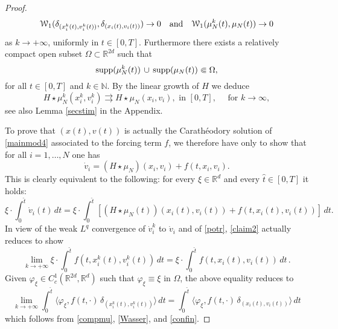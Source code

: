 \documentclass[11pt]{article}
\theoremstyle{plain}
\theoremstyle{definition}
\theoremstyle{remark}
\numberwithin{equation}{section}
\newcommand{\supp}{{\rm supp}}
\newcommand{\R}{{\mathbb R}}
\newcommand{\Om}{\Omega}
\newcommand{\N}{\mathbb N}
\begin{document}
\begin{proof}
\begin{equation}\label{Wasser}
\mathcal W_1 (\delta_{(x_i^k(t),v_i^k(t))}, \delta_{(x_i(t),v_i(t))})\to 0\quad\hbox{and}\quad \mathcal W_1 (\mu_N^k(t), \mu_N(t))\to 0
\end{equation}
as $k\to +\infty$, uniformly in $t\in [0,T]$. Furthermore there exists a relatively compact open subset $\Om \subset \R^{2d}$ such that
\begin{equation}\label{confin}
\supp (\mu_N^k(t))\, \cup \,\supp (\mu_N(t)) \Subset  \Omega,
\end{equation}
for all $t \in [0,T]$ and $k\in \N$. By the linear growth of $H$ we deduce
\begin{equation}\label{potr}
H \star \mu_N^k(x_i^k,v_i^k) \rightrightarrows  H \star \mu_N(x_i,v_i), \mbox{ in } [0,T], \quad \mbox{ for } k \to \infty,
\end{equation}
see also Lemma \ref{secstim} in the Appendix. 

To prove that $(x(t),v(t))$ is actually the Carath{\'e}odory solution of \eqref{mainmod4} associated to 
the forcing term $f$, we therefore have only to show that for all $i=1,\dots,N$ one has
\begin{equation}\label{claim}
\dot v_i = ( H \star \mu_N)(x_i,v_i) + f(t,x_i, v_i).
\end{equation}
This is clearly equivalent to the following: for every $\xi \in \R^d$ and every $\hat t\in [0,T]$ it holds:
\begin{equation}\label{claim2}
\xi\cdot \int_0^{\hat t}\dot v_i(t)\,dt = \xi\cdot \int_0^{\hat t}[( H \star \mu_N(t))(x_i(t),v_i(t))+ f(t,x_i(t), v_i(t))]\,dt.
\end{equation}
In view of the weak $L^q$ convergence of $\dot v_i^k$ to $\dot v_i$ and of \eqref{potr}, \eqref{claim2} actually reduces to show
$$
\lim_{k\to +\infty}\xi\cdot \int_0^{\hat t}f(t,x_i^k(t), v_i^k(t))\,dt=\xi\cdot \int_0^{\hat t}f(t,x_i(t), v_i(t))\,dt\,.
$$
Given $\varphi_{\xi} \in C^1_c(\R^{2d}, \R^d)$ such that $\varphi_{\xi}\equiv \xi$ in $\Om$, the above equality reduces to
$$
\lim_{k\to +\infty}\int_0^{\hat t}\langle \varphi_{\xi},f(t,\cdot)\,\delta_{(x_i^k(t),v_i^k(t))}\rangle\,dt=\int_0^{\hat t}\langle \varphi_{\xi},f(t,\cdot)\,\delta_{(x_i(t),v_i(t))}\rangle\,dt
$$
which follows from \eqref{compmu}, \eqref{Wasser}, and \eqref{confin}.


\end{proof}
\end{document}
